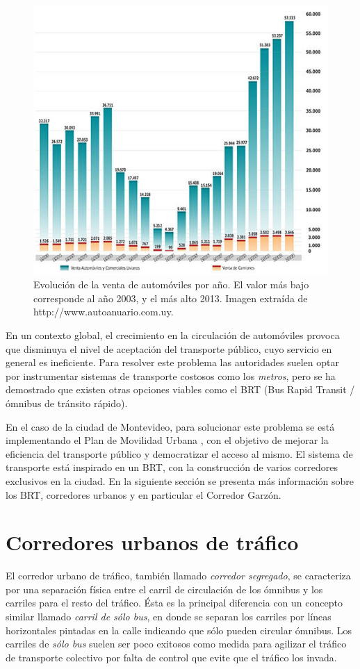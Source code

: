 \begin{figure}[ht]
	\centering
	\includegraphics[width=0.9\linewidth]{Figures/ventas_autos}
	\caption[Evolución de la venta de automóviles en Uruguay]{Evolución de la venta de automóviles por año. El valor más bajo corresponde al año 2003, y el más alto 2013. Imagen extraída de {http://www.autoanuario.com.uy}.}
	\label{fig:ventas_autos}
\end{figure}

En un contexto global, el crecimiento en la circulación de automóviles provoca que disminuya el nivel de aceptación del transporte público, cuyo servicio en general es ineficiente. Para resolver este problema las autoridades suelen optar por instrumentar sistemas de transporte costosos como los \emph{metros}, pero se ha demostrado que existen otras opciones viables como el BRT (Bus Rapid Transit / ómnibus de tránsito rápido)\citep{BRT_Dial}.

En el caso de la ciudad de Montevideo, para solucionar este problema se está implementando el Plan de Movilidad Urbana \citep{PlanMovilidad}, con el objetivo de mejorar la eficiencia del transporte público y democratizar el acceso al mismo. El sistema de transporte está inspirado en un BRT, con la construcción de varios corredores exclusivos en la ciudad. En la siguiente sección se presenta más información sobre los BRT, corredores urbanos y en particular el Corredor Garzón.

\section{Corredores urbanos de tráfico}
El corredor urbano de tráfico, también llamado \emph{corredor segregado}, se caracteriza por una separación física entre el carril de circulación de los ómnibus y los carriles para el resto del tráfico. 
Ésta es la principal diferencia con un concepto similar llamado \emph{carril de sólo bus}, en donde se separan los carriles por líneas horizontales pintadas en la calle indicando que sólo pueden circular ómnibus. Los carriles de \emph{sólo bus} suelen ser poco exitosos como medida para agilizar el tráfico de transporte colectivo por falta de control que evite que el tráfico los invada. 

